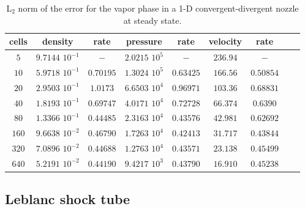 \begin{table}[H]
\begin{center}
 \caption{\label{tbl:l2_norm_vap} L$_2$ norm of the error for the vapor phase in a 1-D convergent-divergent nozzle at steady state.}
 \begin{tabular}{|c|c|c|c|c|c|c|c|c|}
 \hline
cells & density             & rate      & pressure          & rate      & velocity & rate       \\ \hline
$5$   & $9.7144$ $10^{-1}$  & $-$       & $2.0215$ $10^{5}$ & $-$       & $236.94$ & $-$        \\ \hline
$10$  & $5.9718$ $10^{-1}$  & $0.70195$ & $1.3024$ $10^{5}$ & $0.63425$ & $166.56$ & $0.50854$  \\ \hline
$20$  & $2.9503$ $10^{-1}$  & $1.0173$  & $6.6503$ $10^{4}$ & $0.96971$ & $103.36$ & $0.68831$  \\ \hline
$40$  & $1.8193$ $10^{-1}$  & $0.69747$ & $4.0171$ $10^{4}$ & $0.72728$ & $66.374$ & $0.6390$   \\ \hline
$80$  & $1.3366$ $10^{-1}$  & $0.44485$ & $2.3163$ $10^{4}$ & $0.43576$ & $42.981$ & $0.62692$  \\ \hline
$160$ & $9.6638$ $10^{-2}$  & $0.46790$ & $1.7263$ $10^{4}$ & $0.42413$ & $31.717$ & $0.43844$  \\ \hline
$320$ & $7.0896$ $10^{-2}$  & $0.44688$ & $1.2763$ $10^{4}$ & $0.43571$ & $23.138$ & $0.45499$  \\ \hline
$640$ & $5.2191$ $10^{-2}$  & $0.44190$ & $9.4217$ $10^{3}$ & $0.43790$ & $16.910$ & $0.45238$  \\ \hline
\end{tabular}
\end{center}
\nonumber
\end{table}

\subsection{Leblanc shock tube} \label{sec:Leblanc}

